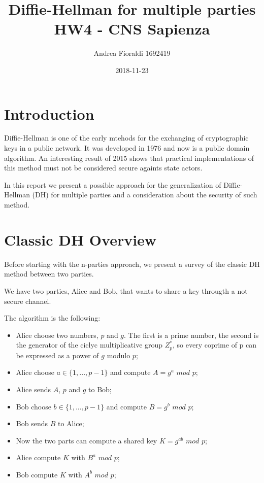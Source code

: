 \documentclass[11pt]{article}
\title{{\bf Diffie-Hellman for multiple parties} \\ \bigskip \large HW4 - CNS Sapienza}
\date{2018-11-23}
\author{Andrea Fioraldi 1692419}
\begin{document}
\maketitle

\section{Introduction}

Diffie-Hellman is one of the early mtehods for the exchanging of cryptographic keys in a public network. It was developed in 1976 \cite{Diffie1976} and now is a public domain algorithm.
An interesting result of 2015 \cite{Adrian2015a} shows that practical implementations of this method must not be considered secure againts state actors.

In this report we present a possible approach for the generalization of Diffie-Hellman (DH) for multiple parties and a consideration about the security of such method.

\section{Classic DH Overview}

Before starting with the n-parties approach, we present a survey of the classic DH method between two parties.

We have two parties, Alice and Bob, that wants to share a key througth a not secure channel.

The algorithm is the following:

\begin{itemize}
    \item Alice choose two numbers, $p$ and $g$. The first is a prime number, the second is the generator of the ciclyc multiplicative group $Z^*_p$, so every coprime of p can be expressed as a power of $g$ modulo $p$;
    \item Alice choose $a \in \{1, ..., p-1\}$ and compute $A = g^a$ $mod$ $p$;
    \item Alice sends $A$, $p$ and $g$ to Bob;
    \item Bob choose $b \in \{1, ..., p-1\}$ and compute $B = g^b$ $mod$ $p$;
    \item Bob sends $B$ to Alice;
    \item Now the two parts can compute a shared key $K = g^{ab}$ $mod$ $p$;
    \item Alice compute $K$ with $B^a$ $mod$ $p$;
    \item Bob compute $K$ with $A^b$ $mod$ $p$;
\end{itemize} 
\end{document}
